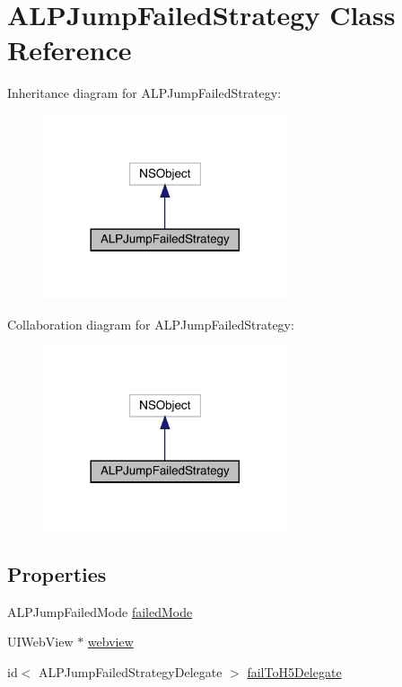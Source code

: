 \hypertarget{interface_a_l_p_jump_failed_strategy}{}\section{A\+L\+P\+Jump\+Failed\+Strategy Class Reference}
\label{interface_a_l_p_jump_failed_strategy}


Inheritance diagram for A\+L\+P\+Jump\+Failed\+Strategy\+:\nopagebreak
\begin{figure}[H]
\begin{center}
\leavevmode
\includegraphics[width=204pt]{interface_a_l_p_jump_failed_strategy__inherit__graph}
\end{center}
\end{figure}


Collaboration diagram for A\+L\+P\+Jump\+Failed\+Strategy\+:\nopagebreak
\begin{figure}[H]
\begin{center}
\leavevmode
\includegraphics[width=204pt]{interface_a_l_p_jump_failed_strategy__coll__graph}
\end{center}
\end{figure}
\subsection*{Properties}
\begin{DoxyCompactItemize}
\item 
A\+L\+P\+Jump\+Failed\+Mode \mbox{\hyperlink{interface_a_l_p_jump_failed_strategy_ac438e2c237669828263e6951e7992f0c}{failed\+Mode}}
\item 
U\+I\+Web\+View $\ast$ \mbox{\hyperlink{interface_a_l_p_jump_failed_strategy_a3f76475bb6bf747c0cd9343c70afa40e}{webview}}
\item 
id$<$ A\+L\+P\+Jump\+Failed\+Strategy\+Delegate $>$ \mbox{\hyperlink{interface_a_l_p_jump_failed_strategy_a0fba4f62f00a8cb0ee9d020309887b01}{fail\+To\+H5\+Delegate}}
\end{DoxyCompactItemize}


